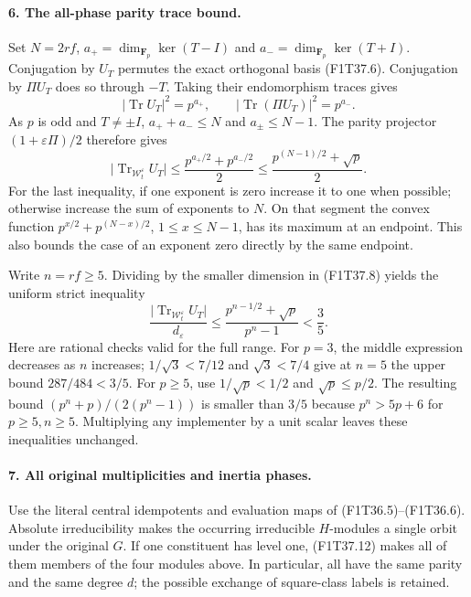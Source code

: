 \paragraph{6. The all-phase parity trace bound.}
Set \(N=2rf\),
\(a_+=\dim_{\mathbf F_p}\ker(T-I)\) and
\(a_-=\dim_{\mathbf F_p}\ker(T+I)\).
Conjugation by \(U_T\) permutes the exact orthogonal
basis (F1T37.6). Conjugation by \(\Pi U_T\) does so
through \(-T\). Taking their endomorphism traces gives
\[
       |\operatorname{Tr}U_T|^2=p^{a_+},\qquad
       |\operatorname{Tr}(\Pi U_T)|^2=p^{a_-}.
\tag{F1T37.15}
\]
As \(p\) is odd and \(T\ne\pm I\),
\(a_++a_-\le N\) and \(a_\pm\le N-1\).
The parity projector \((1+\varepsilon\Pi)/2\) therefore
gives
\[
 \bigl|\operatorname{Tr}_{\mathcal W_t^\varepsilon}U_T\bigr|
 \le \frac{p^{a_+/2}+p^{a_-/2}}{2}
 \le \frac{p^{(N-1)/2}+\sqrt p}{2}.
\tag{F1T37.16}
\]
For the last inequality, if one exponent is zero increase
it to one when possible; otherwise increase the sum of
exponents to \(N\). On that segment the convex function
\(p^{x/2}+p^{(N-x)/2}\), \(1\le x\le N-1\),
has its maximum at an endpoint. This also bounds the
case of an exponent zero directly by the same endpoint.

Write \(n=rf\ge5\). Dividing by the smaller dimension
in (F1T37.8) yields the uniform strict inequality
\[
 \frac{\bigl|\operatorname{Tr}_{\mathcal W_t^\varepsilon}U_T\bigr|}
       {d_\varepsilon}
 \le \frac{p^{n-1/2}+\sqrt p}{p^n-1}<\frac35.
\tag{F1T37.17}
\]
Here are rational checks valid for the full range. For
\(p=3\), the middle expression decreases as \(n\)
increases; \(1/\sqrt3<7/12\) and
\(\sqrt3<7/4\) give at \(n=5\) the upper bound
\(287/484<3/5\). For \(p\ge5\), use
\(1/\sqrt p<1/2\) and \(\sqrt p\le p/2\).
The resulting bound
\((p^n+p)/(2(p^n-1))\) is smaller than \(3/5\)
because \(p^n>5p+6\) for \(p\ge5,n\ge5\).
Multiplying any implementer by a unit scalar leaves
these inequalities unchanged.

\paragraph{7. All original multiplicities and inertia phases.}
Use the literal central idempotents and evaluation maps
of (F1T36.5)--(F1T36.6). Absolute irreducibility makes
the occurring irreducible \(H\)-modules a single orbit
under the original \(G\). If one constituent has level one,
(F1T37.12) makes all of them members of the four
modules above. In particular, all have the same parity
and the same degree \(d\); the possible exchange of
square-class labels is retained.

